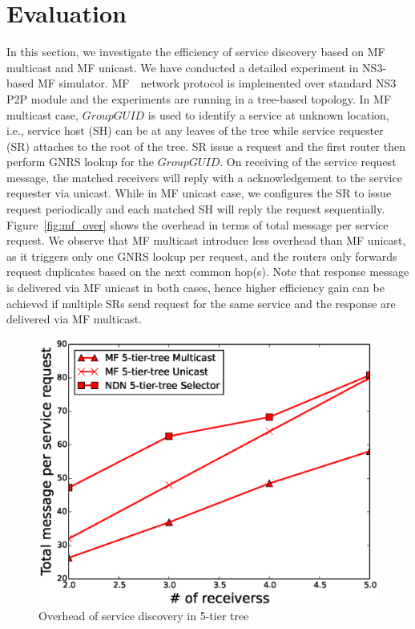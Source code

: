 \section{Evaluation}
In this section, we investigate the efficiency of service discovery based on MF multicast and MF unicast. We have conducted a detailed experiment in NS3-based MF simulator.  MF　network protocol is implemented over standard NS3 P2P module and the experiments are running in a tree-based topology. In MF multicast case, $Group GUID$ is used to identify a service at unknown location, i.e., service host (SH) can be at any leaves of the tree while service requester (SR) attaches to the root of the tree. SR issue a request and the first router then perform  GNRS lookup for the $Group GUID$. On receiving of the service request message, the matched receivers will reply with a acknowledgement to the service requester via unicast. While in MF unicast case, we configures the SR to issue request periodically and each matched SH will reply the request sequentially. Figure~\ref{fig:mf_over} shows the overhead in terms of total message per service request. We observe that MF multicast introduce less overhead than MF unicast, as it triggers only one GNRS lookup per request, and the routers only forwards request duplicates based on the next common hop(s). Note that response message is delivered via MF unicast in both cases, hence higher efficiency gain can be achieved if multiple  SRs send request for the same service and the response are delivered via MF multicast. 
     
\begin{figure}
\includegraphics[width=\columnwidth]{figure/5_service_discovery_overhead.eps}
\caption{\label{fig:5_service_over}Overhead of service discovery in 5-tier tree}
\end{figure}

